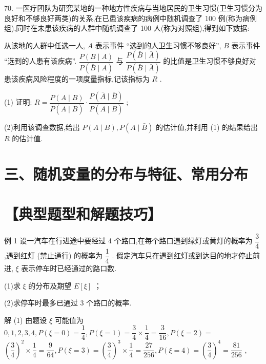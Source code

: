 70. 一医疗团队为研究某地的一种地方性疾病与当地居民的卫生习惯(卫生习惯分为良好和不够良好两类)的关系,在已患该疾病的病例中随机调查了 100 例(称为病例组),同时在未患该疾病的人群中随机调查了 100 人(称为对照组),得到如下数据:

\begin{center}
\end{center}

从该地的人群中任选一人, $A$ 表示事件 “选到的人卫生习惯不够良好”, $B$ 表示事件 “选到的人患有该疾病”. $\dfrac{P\left( {B \mid  A}\right) }{P\left( {\bar{B} \mid  A}\right) }$ 与 $\dfrac{P\left( {\bar{B} \mid  \bar{A}}\right) }{P\left( {\bar{B} \mid  \bar{A}}\right) }$ 的比值是卫生习惯不够良好对患该疾病风险程度的一项度量指标,记该指标为 $R$ .

(1) 证明: $R = \dfrac{P\left( {A \mid  B}\right) }{P\left( {\bar{A} \mid  B}\right) } \cdot  \dfrac{P\left( {\bar{A} \mid  \bar{B}}\right) }{P\left( {A \mid  \bar{B}}\right) }$ ;

(2)利用该调查数据,给出 $P\left( {A \mid  B}\right) ,P\left( {A \mid  \bar{B}}\right)$ 的估计值,并利用 (1) 的结果给出 $R$ 的估计值.

\section*{三、随机变量的分布与特征、常用分布}

\section*{【典型题型和解题技巧】}

例 1 设一汽车在行进途中要经过 4 个路口,在每个路口遇到绿灯或黄灯的概率为 $\dfrac{3}{4}$ ,遇到红灯 (禁止通行) 的概率为 $\dfrac{1}{4}$ . 假定汽车只在遇到红灯或到达目的地才停止前进, $\xi$ 表示停车时已经通过的路口数.

(1)求 $\xi$ 的分布及期望 $E\left\lbrack  \xi \right\rbrack$ ；

(2)求停车时最多已通过 3 个路口的概率.

解 (1) 由题设 $\xi$ 可能值为 $0,1,2,3,4,P\left( {\xi  = 0}\right)  = \dfrac{1}{4},P\left( {\xi  = 1}\right)  = \dfrac{3}{4} \times  \dfrac{1}{4} = \dfrac{3}{16},P\left( {\xi  = 2}\right)  =$  ${\left( \dfrac{3}{4}\right) }^{2} \times  \dfrac{1}{4} = \dfrac{9}{64},P\left( {\xi  = 3}\right)  = {\left( \dfrac{3}{4}\right) }^{3} \times  \dfrac{1}{4} = \dfrac{27}{256},P\left( {\xi  = 4}\right)  = {\left( \dfrac{3}{4}\right) }^{4} = \dfrac{81}{256}$ ,

